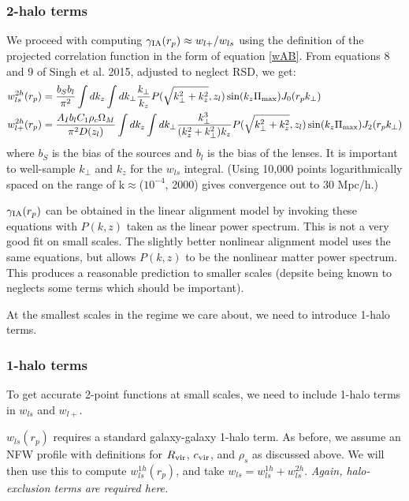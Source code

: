 \documentclass[onecolumn,amsmath,aps,fleqn, superscriptaddress]{revtex4}
\begin{document}
\subsubsection*{2-halo terms}
We proceed with computing $\gamma_{\rm IA}(r_p) \approx w_{l+} / w_{ls}$ using the definition of the projected correlation function in the form of equation \ref{wAB}. From equations 8 and 9 of Singh et al. 2015, adjusted to neglect RSD, we get:
\begin{align}
w_{ls}^{2h}(r_p) &= \frac{b_S b_l}{\pi^2} \int dk_z  \int dk_\perp  \frac{k_\perp}{k_z} P(\sqrt{k_\perp^2 + k_z^2}, z_l) \sin(k_z \Pi_{\rm max}) J_0(r_p k_\perp) \nonumber \\
w_{l+}^{2h}(r_p) &= \frac{A_I b_l C_1 \rho_c \Omega_M}{\pi^2 D(z_l)} \int dk_z  \int dk_\perp  \frac{k_\perp^3 }{(k_z^2 + k_\perp^2)k_z} P(\sqrt{k_\perp^2 + k_z^2}, z_l) \sin(k_z \Pi_{\rm max}) J_2(r_p k_\perp)
\label{ws}
\end{align}
where $b_S$ is the bias of the sources and $b_l$ is the bias of the lenses. It is important to well-sample $k_\perp$ and $k_z$ for the $w_{ls}$ integral. (Using 10,000 points logarithmically spaced on the range of k$\approx$($10^{-4}$, 2000) gives convergence out to $30$ Mpc/h.)

$\gamma_{\rm IA}(r_p)$ can be obtained in the linear alignment model by invoking these equations with $P(k,z)$ taken as the linear power spectrum. This is not a very good fit on small scales. The slightly better nonlinear alignment model uses the same equations, but allows $P(k,z)$ to be the nonlinear matter power spectrum. This produces a reasonable prediction to smaller scales (depsite being known to neglects some terms which should be important). 

At the smallest scales in the regime we care about, we need to introduce 1-halo terms.

\subsubsection*{1-halo terms}
To get accurate 2-point functions at small scales, we need to include 1-halo terms in $w_{ls}$ and $w_{l+}$. 

$w_{ls}(r_p)$ requires a standard galaxy-galaxy 1-halo term. As before, we assume an NFW profile with definitions for $R_{\rm vir}$, $c_{\rm vir}$, and $\rho_s$ as discussed above. We will then use this to compute $w^{1h}_{ls}(r_p)$, and take $w_{ls} = w_{ls}^{1h} + w_{ls}^{2h}$. {\it Again, halo-exclusion terms are required here.} 
\end{document}
